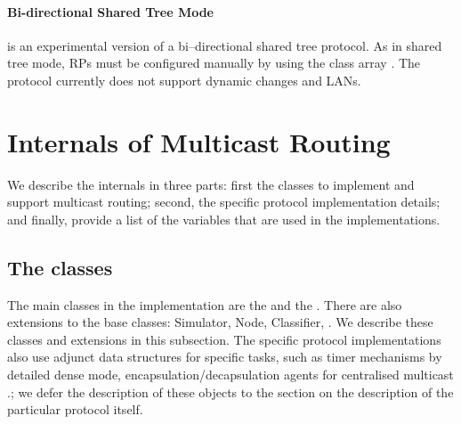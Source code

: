 \paragraph{Bi-directional Shared Tree Mode}
 is an experimental version of a bi--directional shared
tree protocol.  As in shared tree mode, RPs must be configured
manually by using the class array .  The protocol currently
does not support dynamic changes and LANs.

\section{Internals of Multicast Routing}
\label{sec:mcast-internals}

We describe the internals in three parts: first the classes to
implement and support multicast routing; second, the specific protocol
implementation details; and finally, provide a list of the variables
that are used in the implementations.

\subsection{The classes}
The main classes in the implementation are the
 and the
.  There are
also extensions to the base classes: Simulator, Node, Classifier,
\etc.  We describe these classes and extensions in this subsection.
The specific protocol implementations also use adjunct data structures
for specific tasks, such as timer mechanisms by detailed dense mode,
encapsulation/decapsulation agents for centralised multicast \etc.; we
defer the description of these objects to the section on the
description of the particular protocol itself.

